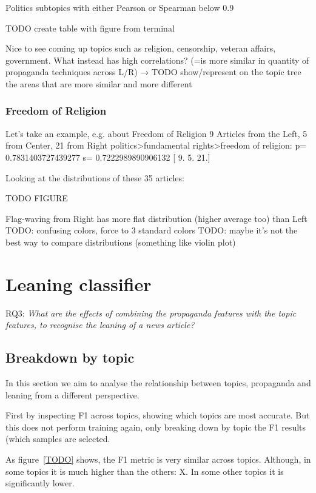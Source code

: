 Politics subtopics with either Pearson or Spearman below 0.9

TODO create table with figure from terminal

Nice to see coming up topics such as religion, censorship, veteran affairs, government.
What instead has high correlations? (=is more similar in quantity of propaganda techniques across L/R) → TODO show/represent on the topic tree the areas that are more similar and more different


\subsubsection{Freedom of Religion}
Let’s take an example, e.g. about Freedom of Religion
9 Articles from the Left, 5 from Center, 21 from Right
politics>fundamental rights>freedom of religion: p= 0.7831403727439277 s= 0.7222989890906132 [ 9.  5. 21.]

Looking at the distributions of these 35 articles:

TODO FIGURE

Flag-waving from Right has more flat distribution (higher average too) than Left
TODO: confusing colors, force to 3 standard colors
TODO: maybe it’s not the best way to compare distributions (something like violin plot)



\section{\statusred Leaning classifier}
\label{sec:topic_classifier_propaganda}

RQ3: \emph{What are the effects of combining the propaganda features with the topic features, to recognise the leaning of a news article?}

\subsection{Breakdown by topic}


In this section we aim to analyse the relationship between topics, propaganda and leaning from a different perspective.

First by inspecting F1 across topics, showing which topics are most accurate.
But this does not perform training again, only breaking down by topic the F1 results (which samples are selected.


As figure~\ref{TODO} shows, the F1 metric is very similar across topics.
Although, in some topics it is much higher than the others: X.
In some other topics it is significantly lower.

